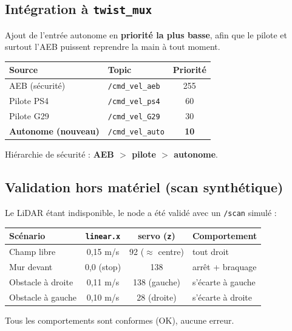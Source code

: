 \documentclass[a4paper,11pt]{article}
\begin{document}
\subsection{Intégration à \texttt{twist\_mux}}
Ajout de l'entrée autonome en \textbf{priorité la plus basse}, afin que le pilote
et surtout l'AEB puissent reprendre la main à tout moment.
\begin{center}
\begin{tabular}{@{}llc@{}}
\toprule
Source & Topic & Priorité \\
\midrule
AEB (sécurité)          & \texttt{/cmd\_vel\_aeb}  & 255 \\
Pilote PS4              & \texttt{/cmd\_vel\_ps4}  & 60 \\
Pilote G29             & \texttt{/cmd\_vel\_G29}  & 30 \\
\textbf{Autonome (nouveau)} & \texttt{/cmd\_vel\_auto} & \textbf{10} \\
\bottomrule
\end{tabular}
\end{center}
Hiérarchie de sécurité : \textbf{AEB $>$ pilote $>$ autonome}.

\subsection{Validation hors matériel (scan synthétique)}
Le LiDAR étant indisponible, le node a été validé avec un \texttt{/scan} simulé :
\begin{center}
\begin{tabular}{@{}lccl@{}}
\toprule
Scénario & \texttt{linear.x} & servo (\texttt{z}) & Comportement \\
\midrule
Champ libre        & 0,15 m/s & 92 ($\approx$ centre) & tout droit \\
Mur devant         & 0,0 (stop) & 138 & arrêt + braquage \\
Obstacle à droite  & 0,11 m/s & 138 (gauche) & s'écarte à gauche \\
Obstacle à gauche  & 0,10 m/s & 28 (droite)  & s'écarte à droite \\
\bottomrule
\end{tabular}
\end{center}
Tous les comportements sont conformes (\textcolor{success}{OK}), aucune erreur.
\end{document}
